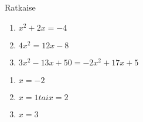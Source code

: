 \begin{tehtava}
    Ratkaise
    \begin{enumerate}
        \item $x^2 + 2x = -4$
        \item $4x^2 = 12x - 8$
        \item $3x^2 - 13x + 50 = -2x^2 + 17x + 5$
    \end{enumerate}
    \begin{vastaus}
        \begin{enumerate}
            \item $x = -2$
            \item $x = 1 tai x = 2$
            \item $x = 3$
        \end{enumerate}
    \end{vastaus}
\end{tehtava}
